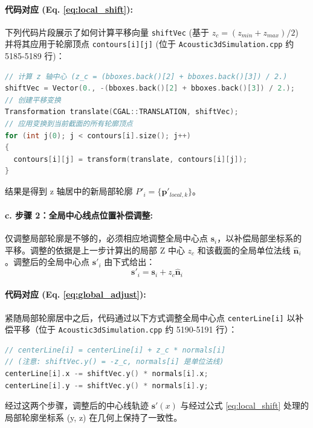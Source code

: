 \documentclass{ctexart}
\begin{document}
\paragraph{代码对应 (Eq. \eqref{eq:local_shift}):} 下列代码片段展示了如何计算平移向量 \texttt{shiftVec} (基于 \(z_c = (z_{min}+z_{max})/2\)) 并将其应用于轮廓顶点 \texttt{contours[i][j]} (位于 \texttt{Acoustic3dSimulation.cpp} 约 5185-5189 行)：
\begin{lstlisting}[language=C++, caption={局部轮廓 Z 轴居中代码实现}]
// 计算 z 轴中心 (z_c = (bboxes.back()[2] + bboxes.back()[3]) / 2.)
shiftVec = Vector(0., -(bboxes.back()[2] + bboxes.back()[3]) / 2.);
// 创建平移变换
Transformation translate(CGAL::TRANSLATION, shiftVec);
// 应用变换到当前截面的所有轮廓顶点
for (int j(0); j < contours[i].size(); j++)
{
  contours[i][j] = transform(translate, contours[i][j]);
}
\end{lstlisting}
结果是得到 z 轴居中的新局部轮廓 \( P'_i = \{\mathbf{p}'_{local, k}\} \)。

\paragraph{c. 步骤 2：全局中心线点位置补偿调整:} 仅调整局部轮廓是不够的，必须相应地调整全局中心点 \(\mathbf{s}_i\)，以补偿局部坐标系的平移。调整的依据是上一步计算出的局部 Z 中心 \(z_c\) 和该截面的全局单位法线 \(\hat{\mathbf{n}}_i\)。调整后的全局中心点 \(\mathbf{s}'_i\) 由下式给出：
\begin{equation} \label{eq:global_adjust}
\mathbf{s}'_i = \mathbf{s}_i + z_c \hat{\mathbf{n}}_i
\end{equation}
\paragraph{代码对应 (Eq. \eqref{eq:global_adjust}):} 紧随局部轮廓居中之后，代码通过以下方式调整全局中心点 \texttt{centerLine[i]} 以补偿平移（位于 \texttt{Acoustic3dSimulation.cpp} 约 5190-5191 行）：
\begin{lstlisting}[language=C++, caption={全局中心点补偿调整代码实现}]
// centerLine[i] = centerLine[i] + z_c * normals[i]
// (注意: shiftVec.y() = -z_c, normals[i] 是单位法线)
centerLine[i].x -= shiftVec.y() * normals[i].x;
centerLine[i].y -= shiftVec.y() * normals[i].y;
\end{lstlisting}
经过这两个步骤，调整后的中心线轨迹 \(\mathbf{s}'(x)\) 与经过公式 \eqref{eq:local_shift} 处理的局部轮廓坐标系 (y, z) 在几何上保持了一致性。
\end{document}
